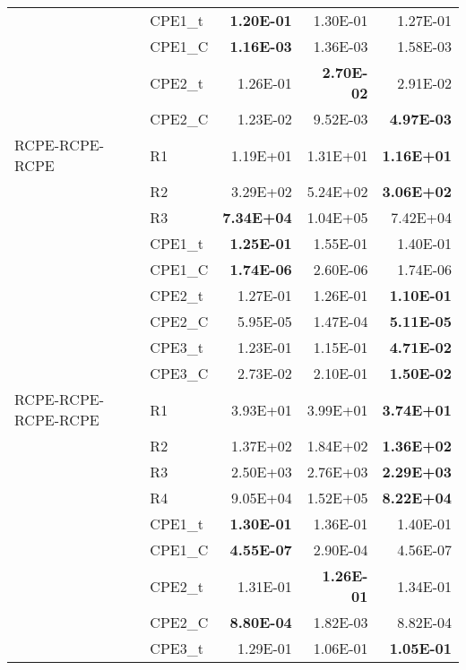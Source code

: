 \begin{tabular}{llrrr}
                     &     CPE1\_t  & \textbf{1.20E-01} & 1.30E-01 & 1.27E-01\\
                     &     CPE1\_C  & \textbf{1.16E-03} & 1.36E-03 & 1.58E-03\\
                     &     CPE2\_t  & 1.26E-01 & \textbf{2.70E-02} & 2.91E-02\\
                     &     CPE2\_C  & 1.23E-02 & 9.52E-03 & \textbf{4.97E-03}\\
     RCPE-RCPE-RCPE  &         R1  & 1.19E+01 & 1.31E+01 & \textbf{1.16E+01}\\
                     &         R2  & 3.29E+02 & 5.24E+02 & \textbf{3.06E+02}\\
                     &         R3  & \textbf{7.34E+04} & 1.04E+05 & 7.42E+04\\
                     &     CPE1\_t  & \textbf{1.25E-01} & 1.55E-01 & 1.40E-01\\
                     &     CPE1\_C  & \textbf{1.74E-06} & 2.60E-06 & 1.74E-06\\
                     &     CPE2\_t  & 1.27E-01 & 1.26E-01 & \textbf{1.10E-01}\\
                     &     CPE2\_C  & 5.95E-05 & 1.47E-04 & \textbf{5.11E-05}\\
                     &     CPE3\_t  & 1.23E-01 & 1.15E-01 & \textbf{4.71E-02}\\
                     &     CPE3\_C  & 2.73E-02 & 2.10E-01 & \textbf{1.50E-02}\\
RCPE-RCPE-RCPE-RCPE  &         R1  & 3.93E+01 & 3.99E+01 & \textbf{3.74E+01}\\
                     &         R2  & 1.37E+02 & 1.84E+02 & \textbf{1.36E+02}\\
                     &         R3  & 2.50E+03 & 2.76E+03 & \textbf{2.29E+03}\\
                     &         R4  & 9.05E+04 & 1.52E+05 & \textbf{8.22E+04}\\
                     &     CPE1\_t  & \textbf{1.30E-01} & 1.36E-01 & 1.40E-01\\
                     &     CPE1\_C  & \textbf{4.55E-07} & 2.90E-04 & 4.56E-07\\
                     &     CPE2\_t  & 1.31E-01 & \textbf{1.26E-01} & 1.34E-01\\
                     &     CPE2\_C  & \textbf{8.80E-04} & 1.82E-03 & 8.82E-04\\
                     &     CPE3\_t  & 1.29E-01 & 1.06E-01 & \textbf{1.05E-01}\\

\end{tabular}
